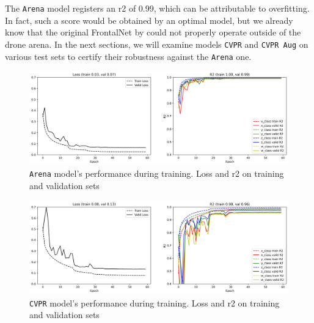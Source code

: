 The \texttt{Arena} model registers an \gls{r2} of 0.99, which can be attributable to overfitting. In fact, such a score would be obtained by an optimal model, but we already know that the original FrontalNet by \cite{mantegazza2019visionbased} could not properly operate outside of the drone arena. In the next sections, we will examine models \texttt{CVPR} and \texttt{CVPR Aug} on various test sets to certify their robustness against the \texttt{Arena} one.

\begin{figure}[H]
	\centering
	\includegraphics[width=1 \textwidth]{"contents/images/06-training-arena"}
	\caption[\texttt{Arena} model's performance during training. Loss and \gls{r2} on training and validation sets]{\texttt{Arena} model's performance during training. Loss and \gls{r2} on training and validation sets}
	\label{fig:training-metrics-arena}
\end{figure}

\begin{figure}[H]
	\centering
	\includegraphics[width=1 \textwidth]{"contents/images/06-training-CVPR"}
	\caption[\texttt{CVPR} model's performance during training. Loss and \gls{r2} on training and validation sets]{\texttt{CVPR} model's performance during training. Loss and \gls{r2} on training and validation sets}
	\label{fig:training-metrics-cvpr}
\end{figure}

